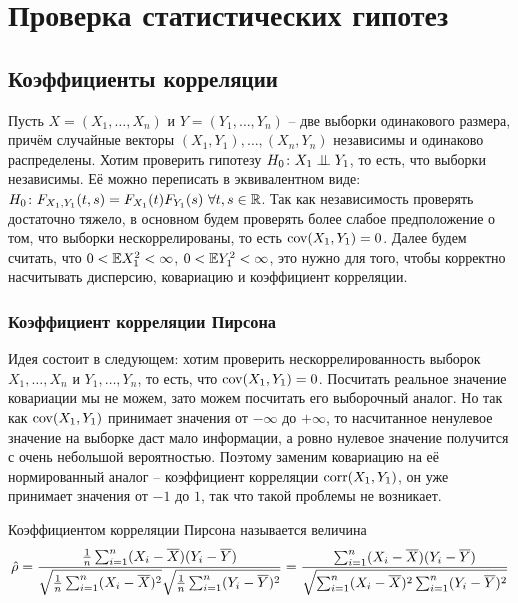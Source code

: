 \section{Проверка статистических гипотез}

\subsection{Коэффициенты корреляции}

\begin{note}
    Пусть $X = (X_1, \dots, X_n)$ и $Y = (Y_1, \dots, Y_n)$ -- две выборки одинакового размера, причём случайные векторы $(X_1, Y_1), \dots, (X_n, Y_n)$ независимы и одинаково распределены. Хотим проверить гипотезу $H_0 \colon X_1 \perp\mkern-9.5mu\perp Y_1$, то есть, что выборки независимы. Её можно переписать в эквивалентном виде: $H_0 \colon F_{X_1, Y_1}(t, s) = F_{X_1}(t) F_{Y_1}(s) \ \forall t, s \in \mathbb{R}$. Так как независимость проверять достаточно тяжело, в основном будем проверять более слабое предположение о том, что выборки нескоррелированы, то есть $\operatorname{cov}(X_1, Y_1) = 0$. Далее будем считать, что $0 < \mathbb{E} X_1^2 < \infty$, $0 < \mathbb{E} Y_1^2 < \infty$, это нужно для того, чтобы корректно насчитывать дисперсию, ковариацию и коэффициент корреляции. 
\end{note}

\subsubsection{Коэффициент корреляции Пирсона}

\begin{note}
    Идея состоит в следующем: хотим проверить нескоррелированность выборок $X_1, \dots, X_n$ и $Y_1, \dots, Y_n$, то есть, что $\operatorname{cov}(X_1, Y_1) = 0$. Посчитать реальное значение ковариации мы не можем, зато можем посчитать его выборочный аналог. Но так как $\operatorname{cov}(X_1, Y_1)$ принимает значения от $-\infty$ до $+\infty$, то насчитанное ненулевое значение на выборке даст мало информации, а ровно нулевое значение получится с очень небольшой вероятностью. Поэтому заменим ковариацию на её нормированный аналог -- коэффициент корреляции $\operatorname{corr}(X_1, Y_1)$, он уже принимает значения от $-1$ до $1$, так что такой проблемы не возникает.
\end{note}

\begin{definition}
    Коэффициентом корреляции Пирсона называется величина
    \[
        \hat{\rho} = \frac{\frac{1}{n} \sum_{i=1}^n (X_i - \overline{X})(Y_i-\overline{Y})}{\sqrt{\frac{1}{n} \sum_{i=1}^n (X_i-\overline{X})^2} \sqrt{\frac{1}{n} \sum_{i=1}^n (Y_i-\overline{Y})^2}} = \frac{\sum_{i=1}^n (X_i - \overline{X})(Y_i-\overline{Y})}{\sqrt{\sum_{i=1}^n (X_i-\overline{X})^2 \sum_{i=1}^n (Y_i-\overline{Y})^2}}
    \]
\end{definition}

